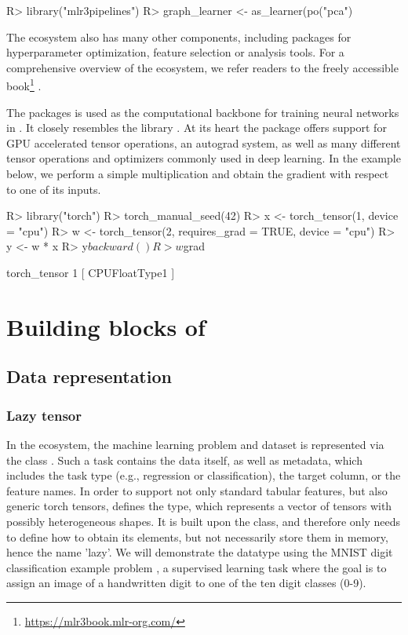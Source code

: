 \documentclass[article]{jss}
\theoremstyle{definition}
\begin{document}
\begin{CodeInput}
R> library("mlr3pipelines")
R> graph_learner <- as_learner(po("pca") %
\end{CodeInput}

The  ecosystem also has many other components, including packages for hyperparameter optimization, feature selection or analysis tools.
For a comprehensive overview of the  ecosystem, we refer readers to the freely accessible book\footnote{\url{https://mlr3book.mlr-org.com/}} \citep{ref-mlr3book}.

The  packages is used as the computational backbone for training neural networks in .
It closely resembles the \pytorch{} \python{} library \citep{ref-pytorch}.
At its heart the package offers support for GPU accelerated tensor operations, an autograd system, as well as many different tensor operations and optimizers commonly used in deep learning.
In the example below, we perform a simple multiplication and obtain the gradient with respect to one of its inputs.

\begin{CodeInput}
R> library("torch")
R> torch_manual_seed(42)
R> x <- torch_tensor(1, device = "cpu")
R> w <- torch_tensor(2, requires_grad = TRUE, device = "cpu")
R> y <- w * x
R> y$backward()
R> w$grad
\end{CodeInput}
\begin{CodeOutput}
torch_tensor
 1
[ CPUFloatType{1} ]
\end{CodeOutput}

\section[Building blocks of mlr3torch]{Building blocks of }\label{sec:building-blocks}

\subsection{Data representation}

\subsubsection{Lazy tensor}

In the  ecosystem, the machine learning problem and dataset is represented via the  class .
Such a task contains the data itself, as well as metadata, which includes the task type (e.g., regression or classification), the target column, or the feature names.
In order to support not only standard tabular features, but also generic torch tensors,  defines the  type, which represents a vector of tensors with possibly heterogeneous shapes.
It is built upon the  class, and therefore only needs to define how to obtain its elements, but not necessarily store them in memory, hence the name 'lazy'.
We will demonstrate the datatype using the MNIST digit classification example problem \citep{ref-mnist-2012}, a supervised learning task where the goal is to assign an image of a handwritten digit to one of the ten digit classes (0-9).
\end{document}
